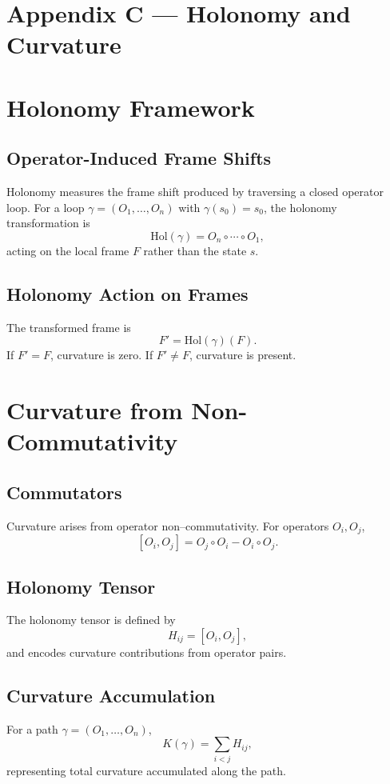 \appendix
\section*{Appendix C — Holonomy and Curvature}

\section{Holonomy Framework}

\subsection{Operator-Induced Frame Shifts}
Holonomy measures the frame shift produced by traversing a closed
operator loop. For a loop $\gamma = (O_1, \ldots, O_n)$ with
$\gamma(s_0) = s_0$, the holonomy transformation is
\[
\mathrm{Hol}(\gamma) = O_n \circ \cdots \circ O_1,
\]
acting on the local frame $F$ rather than the state $s$.

\subsection{Holonomy Action on Frames}
The transformed frame is
\[
F' = \mathrm{Hol}(\gamma)(F).
\]
If $F' = F$, curvature is zero. If $F' \neq F$, curvature is present.

\section{Curvature from Non-Commutativity}

\subsection{Commutators}
Curvature arises from operator non–commutativity. For operators
$O_i, O_j$,
\[
[O_i, O_j] = O_j \circ O_i - O_i \circ O_j.
\]

\subsection{Holonomy Tensor}
The holonomy tensor is defined by
\[
H_{ij} = [O_i, O_j],
\]
and encodes curvature contributions from operator pairs.

\subsection{Curvature Accumulation}
For a path $\gamma = (O_1, \ldots, O_n)$,
\[
K(\gamma) = \sum_{i < j} H_{ij},
\]
representing total curvature accumulated along the path.

